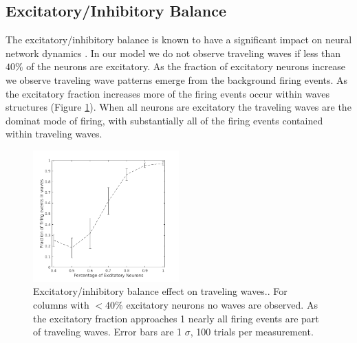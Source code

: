 \documentclass[a4paper,11pt]{article}
\begin{document}
\subsection{Excitatory/Inhibitory Balance}
The excitatory/inhibitory balance is known to have a significant impact on neural network dynamics \cite{keane2015}. 
In our model we do not observe traveling waves if less than $40\%$ of the neurons are excitatory.
As the fraction of excitatory neurons increase we observe traveling wave patterns emerge from the background firing events.
As the excitatory fraction increases more of the firing events occur within waves structures (Figure \ref{fig:excitatory_effect}).
When all neurons are excitatory the traveling waves are the dominat mode of firing, with substantially all of the firing events contained within traveling waves. \\
\begin{figure}[!htb]
 \caption{Excitatory/inhibitory balance effect on traveling waves.. 
	  For columns with $<40\%$ excitatory neurons no waves are observed.
	  As the excitatory fraction approaches 1 nearly all firing events are part of traveling waves.
	  Error bars are 1 $\sigma$, 100 trials per measurement.
	  }
 \label{fig:excitatory_effect}
 \centering
   \includegraphics[width=0.5\textwidth]{fig/ExcitatoryWaves}
\end{figure}
\end{document}
